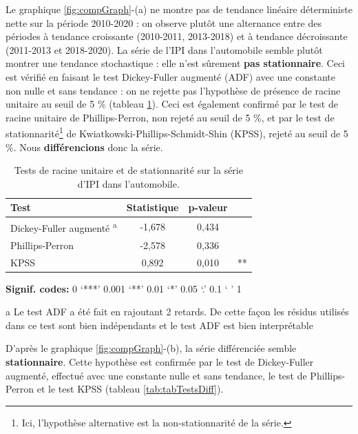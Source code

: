 \documentclass[french]{article}
\begin{document}
Le graphique \ref{fig:compGraph}-(a) ne montre pas de tendance linéaire déterministe nette sur la période 2010-2020 : on observe plutôt une alternance entre des périodes à tendance croissante (2010-2011, 2013-2018) et à tendance décroissante (2011-2013 et 2018-2020).
La série de l'IPI dans l'automobile semble plutôt montrer une tendance stochastique : elle n'est sûrement \textbf{pas stationnaire}. Ceci est vérifié en faisant le test Dickey-Fuller augmenté (ADF) avec une constante non nulle et sans tendance : on ne rejette pas l'hypothèse de présence de racine unitaire au seuil de 5 \% (tableau \ref{tab:tabTestsInit}).
Ceci est également confirmé par le test de racine unitaire de Phillips-Perron, non rejeté au seuil de 5 \%, et par le test de stationnarité\footnote{Ici, l'hypothèse alternative est la non-stationnarité de la série.} de Kwiatkowski-Phillips-Schmidt-Shin (KPSS), rejeté au seuil de 5 \%. Nous \textbf{différencions} donc la série.

\begin{table}[!h]

\caption{\label{tab:tabTestsInit}Tests de racine unitaire et de stationnarité sur la série d'IPI dans l'automobile.}
\centering
\begin{threeparttable}
\begin{tabular}[t]{lccc}
\toprule
Test & Statistique & p-valeur & \\
\midrule
Dickey-Fuller augmenté \textsuperscript{a} & -1,678 & 0,434 & \\
Phillips-Perron & -2,578 & 0,336 & \\
KPSS & 0,892 & 0,010 & **\\
\bottomrule
\end{tabular}
\begin{tablenotes}
\item \hspace{-0.4cm}\textbf{Signif. codes: }0 `***' 0.001 `**' 0.01 `*' 0.05 `.' 0.1 ` ' 1
\item[a] Le test ADF a été fait en rajoutant 2 retards. De cette façon les résidus utilisés dans ce test sont bien indépendants et le test ADF est bien interprétable
\end{tablenotes}
\end{threeparttable}
\end{table}

D'après le graphique \ref{fig:compGraph}-(b), la série différenciée semble \textbf{stationnaire}.
Cette hypothèse est confirmée par le test de Dickey-Fuller augmenté, effectué avec une constante nulle et sans tendance, le test de Phillips-Perron et le test KPSS (tableau \ref{tab:tabTestsDiff}).
\end{document}
